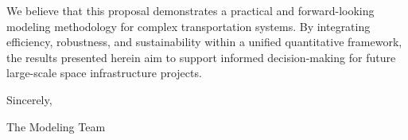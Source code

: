 \documentclass[12pt]{article}
\begin{document}
\vspace{0.5em}

\noindent
We believe that this proposal demonstrates a practical and forward-looking modeling methodology for complex transportation systems. By integrating efficiency, robustness, and sustainability within a unified quantitative framework, the results presented herein aim to support informed decision-making for future large-scale space infrastructure projects.

\vspace{1em}

\noindent
Sincerely,

\vspace{1.5em}

\noindent
The Modeling Team

\newpage
\end{document}
